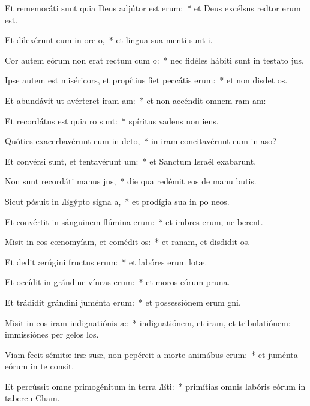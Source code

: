 \item Et rememoráti sunt quia Deus adjútor est erum:~* et Deus excélsus redtor erum est.
\item Et dilexérunt eum in ore o,~* et lingua sua menti sunt i.
\item Cor autem eórum non erat rectum cum o:~* nec fidéles hábiti sunt in testato jus.
\item Ipse autem est miséricors, et propítius fiet peccátis erum:~* et non disdet os.
\item Et abundávit ut avérteret iram am:~* et non accéndit omnem ram am:
\item Et recordátus est quia ro sunt:~* spíritus vadens  non iens.
\item Quóties exacerbavérunt eum in deto,~* in iram concitavérunt eum in aso?
\item Et convérsi sunt, et tentavérunt um:~* et Sanctum Israël exabarunt.
\item Non sunt recordáti manus jus,~* die qua redémit eos de manu butis.
\item Sicut pósuit in Ægýpto signa a,~* et prodígia sua in po neos.
\item Et convértit in sánguinem flúmina erum:~* et imbres erum, ne berent.
\item Misit in eos cœnomyíam, et comédit os:~* et ranam, et disdidit os.
\item Et dedit ærúgini fructus erum:~* et labóres erum lotæ.
\item Et occídit in grándine víneas erum:~* et moros eórum  pruna.
\item Et trádidit grándini juménta erum:~* et possessiónem erum gni.
\item Misit in eos iram indignatiónis æ:~* indignatiónem, et iram, et tribulatiónem: immissiónes per gelos los.
\item Viam fecit sémitæ iræ suæ, non pepércit a morte animábus erum:~* et juménta eórum in te consit.
\item Et percússit omne primogénitum in terra Æti:~* primítias omnis labóris eórum in tabercu Cham.
